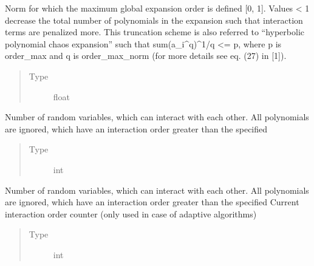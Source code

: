 \documentclass[letterpaper,10pt,english,openany,oneside]{sphinxmanual}
\begin{document}
\begin{fulllineitems}

\begin{fulllineitems}
\label{\detokenize{pygpc:pygpc.SGPC.SGPC.order_max_norm}}
Norm for which the maximum global expansion order is defined {[}0, 1{]}. Values \textless{} 1 decrease the total number
of polynomials in the expansion such that interaction terms are penalized more. This truncation scheme
is also referred to “hyperbolic polynomial chaos expansion” such that sum(a\_i\textasciicircum{}q)\textasciicircum{}1/q \textless{}= p,
where p is order\_max and q is order\_max\_norm (for more details see eq. (27) in {[}1{]}).
\begin{quote}\begin{description}
\item[{Type}] \leavevmode
float

\end{description}\end{quote}

\end{fulllineitems}


\begin{fulllineitems}
\label{\detokenize{pygpc:pygpc.SGPC.SGPC.interaction_order}}
Number of random variables, which can interact with each other.
All polynomials are ignored, which have an interaction order greater than the specified
\begin{quote}\begin{description}
\item[{Type}] \leavevmode
int

\end{description}\end{quote}

\end{fulllineitems}


\begin{fulllineitems}
\label{\detokenize{pygpc:pygpc.SGPC.SGPC.interaction_order_current}}
Number of random variables, which can interact with each other.
All polynomials are ignored, which have an interaction order greater than the specified
Current interaction order counter (only used in case of adaptive algorithms)
\begin{quote}\begin{description}
\item[{Type}] \leavevmode
int


\end{description}
\end{quote}
\end{fulllineitems}
\end{fulllineitems}
\end{document}

